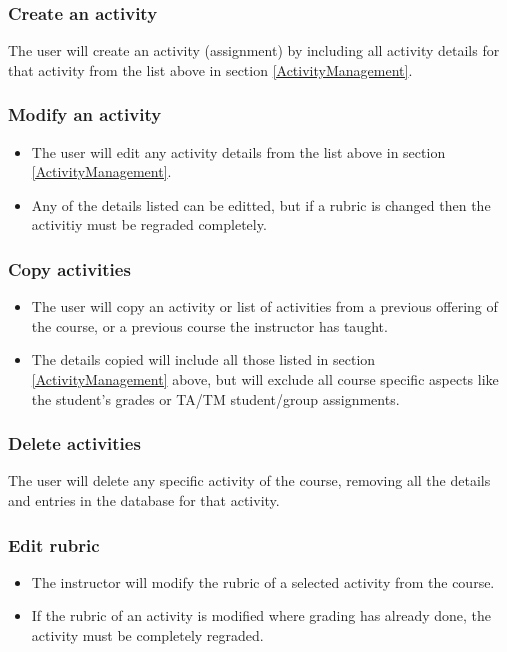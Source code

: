 \documentclass{article}
\begin{document}
\subsubsection{Create an activity \label{CreateAct}}
The user will create an activity (assignment) by including all activity
details for that activity from the list above in section \ref{ActivityManagement}.
\subsubsection{Modify an activity \label{ModifyAct}}
\begin{itemize}
	\item The user will edit any activity details from the list above in section 
		\ref{ActivityManagement}.
	\item Any of the details listed can be editted, but if a rubric is changed then
		the activitiy must be regraded completely.
\end{itemize}
\subsubsection{Copy activities \label{copyAct}}
\begin{itemize}
	\item The user will copy an activity or list of activities from a previous 
		offering of the course, or a previous course the instructor has taught.
	\item The details copied will include all those listed in section \ref{ActivityManagement}
		above, but will exclude all course specific aspects like the student's grades
		or TA/TM student/group assignments.
\end{itemize}
\subsubsection{Delete activities \label{deleteAct}}
The user will delete any specific activity of the course, removing all the details and entries
in the database for that activity.
\subsubsection{Edit rubric \label{editRubric}}
\begin{itemize}
	\item The instructor will modify the rubric of a selected activity from the course.
	\item If the rubric of an activity is modified where grading has already done, the 
		activity must be completely regraded.
\end{itemize}
\end{document}
